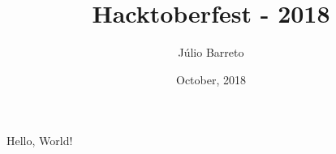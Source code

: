 \documentclass{article}
\title{Hacktoberfest - 2018}
\author{Júlio Barreto}
\date{October, 2018}
\begin{document}
\maketitle

    Hello, World!
\end{document}
